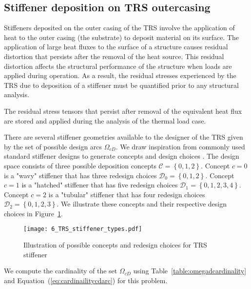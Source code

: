 \subsection{Stiffener deposition on \ac{TRS} outercasing} \label{subsec:stiffeners}

Stiffeners deposited on the outer casing of the \ac{TRS} involve the application of heat to the outer casing (the substrate) to deposit material on its surface. The application of large heat fluxes to the surface of a structure causes residual distortion that persists after the removal of the heat source. This residual distortion affects the structural performance of the structure when loads are applied during operation. As a result, the residual stresses experienced by the \ac{TRS} due to deposition of a stiffener must be quantified prior to any structural analysis.

The residual stress tensors that persist after removal of the equivalent heat flux are stored and applied during the analysis of the thermal load case.

There are several stiffener geometries available to the designer of the \ac{TRS} given by the set of possible design arcs $\Omega_{cD}$. We draw inspiration from commonly used standard stiffener designs to generate concepts and design choices \cite{USArmyMaterielCommand1970}. The design space consists of three possible deposition concepts $\mathcal{C} = \left\{0,1,2\right\}$. Concept $c=0$ is a "wavy" stiffener that has three redesign choices $\mathcal{D}_0 = \left\{0,1,2\right\}$. Concept $c=1$ is a "hatched" stiffener that has five redesign choices $\mathcal{D}_1 = \left\{0,1,2,3,4\right\}$. Concept $c=2$ is a "tubular" stiffener that has four redesign choices $\mathcal{D}_2 = \left\{0,1,2,3\right\}$. We illustrate these concepts and their respective design choices in Figure~\ref{fig:designspacestiff}.

\begin{figure}[h!]
	\centering
	\texttt{[image: 6\_TRS\_stiffener\_types.pdf]}
	\caption{Illustration of possible concepts and redesign choices for \ac{TRS} stiffener}
	\label{fig:designspacestiff}
\end{figure}

We compute the cardinality of the set $\Omega_{cD}$ using Table~\ref{table:omegadcardinality} and Equation~(\ref{eq:cardinailitycdarc}) for this problem.

